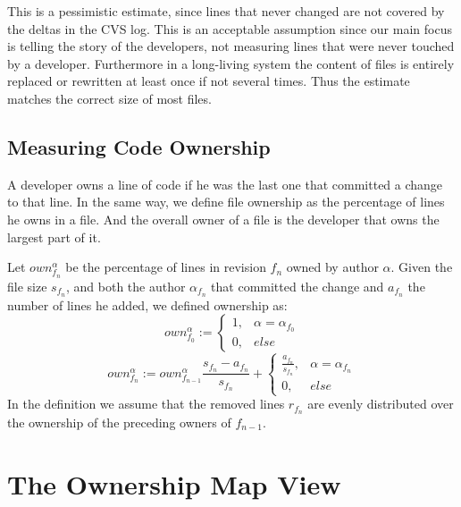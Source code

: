 This is a pessimistic estimate, since lines that never changed are not covered by the deltas in the CVS log. This is an acceptable assumption since our main focus is telling the story of the developers, not measuring lines that were never touched by a developer. Furthermore in a long-living system the content of files is entirely replaced or rewritten at least once if not several times. Thus the estimate matches the correct size of most files.

\subsection{Measuring Code Ownership}

A developer owns a line of code if he was the last one that committed a change to that line. In the same way, we define file ownership as the percentage of lines he owns in a file. And the overall owner of a file is the developer that owns the largest part of it.

Let $own_{f_n}^\alpha$ be the percentage of lines in revision $f_n$ owned by author $\alpha$. Given the file size $s_{f_n}$, and both the author $\alpha_{f_n}$ that committed the change and $a_{f_n}$ the number of lines he added, we defined ownership as:
\[
own_{f_0}^\alpha:=\left\{
    \begin{array}{cl}
        1, & \alpha=\alpha_{f_0} \\
        0, & else
    \end{array}\right.
\]
\[
own_{f_n}^\alpha:=own_{f_{n-1}}^\alpha \frac{s_{f_n} - a_{f_n}}{s_{f_n}} + \left\{
    \begin{array}{cl}
        \frac{a_{f_n}}{s_{f_n}}, & \alpha=\alpha_{f_n} \\
        0, & else
    \end{array}\right.
\]
In the definition we assume that the removed lines $r_{f_n}$ are evenly distributed over the ownership of the preceding owners of $f_{n-1}$.

\section{The Ownership Map View}\label{sec:approach}

